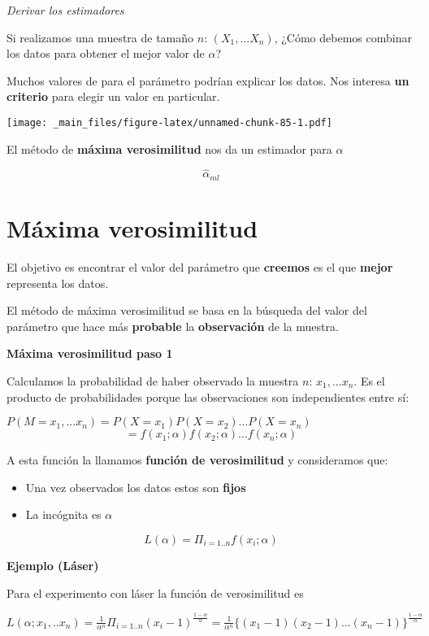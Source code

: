 \documentclass[
]{book}
\providecommand{\tightlist}{%
  \setlength{\itemsep}{0pt}\setlength{\parskip}{0pt}}
\begin{document}
\emph{Derivar los estimadores}

Si realizamos una muestra de tamaño \(n\): \((X_1,...X_n)\), ¿Cómo debemos combinar los datos para obtener el mejor valor de \(\alpha\)?

Muchos valores de para el parámetro podrían explicar los datos. Nos interesa \textbf{un criterio} para elegir un valor en particular.

\texttt{[image: \_main\_files/figure-latex/unnamed-chunk-85-1.pdf]}

El método de \textbf{máxima verosimilitud} nos da un estimador para \(\alpha\)

\[\hat{\alpha}_{ml}\]

\hypertarget{muxe1xima-verosimilitud-1}{%
\section{Máxima verosimilitud}\label{muxe1xima-verosimilitud-1}}

El objetivo es encontrar el valor del parámetro que \textbf{creemos} es el que \textbf{mejor} representa los datos.

El método de máxima verosimilitud se basa en la búsqueda del valor del parámetro que hace más \textbf{probable} la \textbf{observación} de la muestra.

\textbf{Máxima verosimilitud paso 1}

Calculamos la probabilidad de haber observado la muestra \(n\): \(x_1,...x_n\). Es el producto de probabilidades porque las observaciones son independientes entre sí:

\(P(M=x_1,...x_n)=P(X=x_1)P(X=x_2)...P(X=x_n)\)
\[=f(x_1;\alpha)f(x_2;\alpha) ...f(x_n;\alpha)\]

A esta función la llamamos \textbf{función de verosimilitud} y consideramos que:

\begin{itemize}
\tightlist
\item
  Una vez observados los datos estos son \textbf{fijos}
\item
  La incógnita es \(\alpha\)
\end{itemize}

\[L(\alpha)= \Pi_{i=1..n} f(x_i; \alpha)\]

\textbf{Ejemplo (Láser)}

Para el experimento con láser la función de verosimilitud es

\(L(\alpha;x_1,..x_n)= \frac{1}{\alpha^n} \Pi_{i=1..n} (x_i-1)^{\frac{1-\alpha}{ \alpha}}= \frac{1}{\alpha^n} \{(x_1-1)(x_2-1)...(x_n-1)\}^{\frac{1-\alpha}{\alpha}}\)
\end{document}
